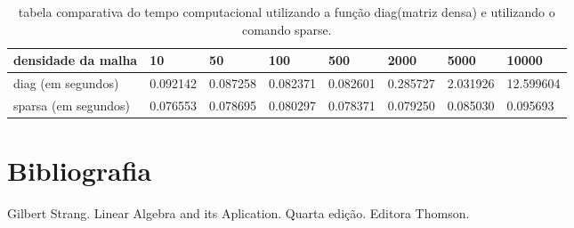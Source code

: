\documentclass[a4paper]{article}
\begin{document}
  
  \begin{table}[h]
\centering
\caption{tabela comparativa do tempo computacional utilizando a função diag(matriz densa) e utilizando o comando sparse.}
\label{my-label}
\begin{tabular}{|l|l|l|l|l|l|l|l|}
\hline
densidade da malha  & 10       & 50       & 100      & 500      & 2000     & 5000     & 10000     \\ \hline
diag (em segundos)  & 0.092142 & 0.087258 & 0.082371 & 0.082601 & 0.285727 & 2.031926 & 12.599604 \\ \hline
sparsa (em segundos) & 0.076553 & 0.078695 & 0.080297 & 0.078371 & 0.079250 & 0.085030 & 0.095693  \\ \hline
\end{tabular}
\end{table}

\section{Bibliografia}

Gilbert Strang. Linear Algebra and its Aplication. Quarta edição. Editora Thomson.
   
  
  

 
  
   
\end{document}
